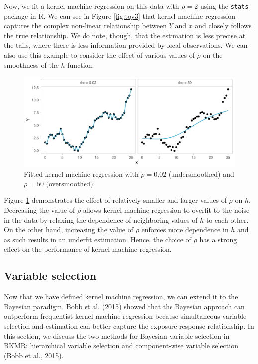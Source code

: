 \documentclass[12pt, twoside]{amherstthesis}
\begin{document}
Now, we fit a kernel machine regression on this data with \(\rho=2\) using the \texttt{stats} package in R. We can see in Figure \ref{fig:toy3} that kernel machine regression captures the complex non-linear relationship between \(Y\) and \(x\) and closely follows the true relationship. We do note, though, that the estimation is less precise at the tails, where there is less information provided by local observations. We can also use this example to consider the effect of various values of \(\rho\) on the smoothness of the \(h\) function.
\begin{figure}

{\centering \includegraphics[width=1\linewidth]{figures/ch3_toyrho} 

}

\caption{Fitted kernel machine regression with $\rho=0.02$ (undersmoothed) and $\rho=50$ (oversmoothed).}\label{fig:toyrho}
\end{figure}
Figure \ref{fig:toyrho} demonstrates the effect of relatively smaller and larger values of \(\rho\) on \(h\). Decreasing the value of \(\rho\) allows kernel machine regression to overfit to the noise in the data by relaxing the dependence of neighboring values of \(h\) to each other. On the other hand, increasing the value of \(\rho\) enforces more dependence in \(h\) and as such results in an underfit estimation. Hence, the choice of \(\rho\) has a strong effect on the performance of kernel machine regression.

\hypertarget{variable-selection}{%
\subsection{Variable selection}\label{variable-selection}}

Now that we have defined kernel machine regression, we can extend it to the Bayesian paradigm. Bobb et al. (\protect\hyperlink{ref-bobb_bayesian_2015}{2015}) showed that the Bayesian approach can outperform frequentist kernel machine regression because simultaneous variable selection and estimation can better capture the exposure-response relationship. In this section, we discuss the two methods for Bayesian variable selection in BKMR: hierarchical variable selection and component-wise variable selection (\protect\hyperlink{ref-bobb_bayesian_2015}{Bobb et al., 2015}).
\end{document}

